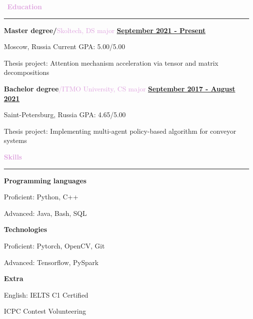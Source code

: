 \documentclass[11pt,a4paper]{report}
\begin{document}
\par\hbox{
\Large{\textcolor{Plum}{\textbf{Education}}}
}{\kern5pt\hrule\kern5pt}

\textbf{\large{Master degree/}}\textcolor{Plum}{Skoltech, DS major}
\hfill
\textbf{\underline{September 2021 - Present}}

Moscow, Russia \hfill Current GPA: 5.00/5.00

\hspace{6mm}
Thesis project: Attention mechanism acceleration via tensor and matrix decompositions

\vspace{3mm}

\textbf{\large{Bachelor degree}}\textcolor{Plum}{/ITMO University, CS major}
\hfill
\textbf{\underline{September 2017 - August 2021}}

Saint-Petersburg, Russia \hfill GPA: 4.65/5.00

\hspace{6mm}
Thesis project: Implementing multi-agent policy-based algorithm for conveyor systems

\vspace{3mm}
\par\hbox{\Large{\textcolor{Plum}{\textbf{Skills}}}}\kern5pt\hrule
\begin{multicols}{3}

\textbf{\large{Programming languages}}

Proficient: Python, C++

Advanced: Java, Bash, SQL

\vspace{6mm}

\textbf{\large{Technologies}}

Proficient: Pytorch, OpenCV, Git

Advanced: Tensorflow, PySpark

\textbf{\large{Extra}}

English: IELTS C1 Certified

ICPC Contest Volunteering

\end{multicols}
\end{document}
